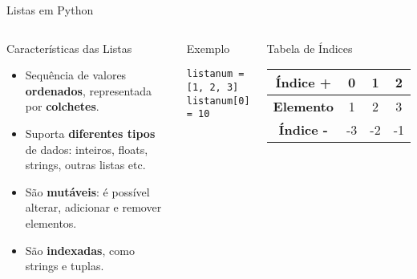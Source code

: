 \begin{frame}[fragile]{Listas em Python}

\begin{columns}[T]
    \begin{block}{Características das Listas}
        \begin{itemize}
            \item Sequência de valores \textbf{ordenados}, representada por \textbf{colchetes}.
            \item Suporta \textbf{diferentes tipos} de dados: inteiros, floats, strings, outras listas etc.
            \item São \textbf{mutáveis}: é possível alterar, adicionar e remover elementos.
            \item São \textbf{indexadas}, como strings e tuplas.
        \end{itemize}
    \end{block}

    \begin{block}{Exemplo}
\begin{verbatim}
listanum = [1, 2, 3]
listanum[0] = 10
\end{verbatim}
    \end{block}

    \begin{exampleblock}{Tabela de Índices}
    \centering
    \begin{tabular}{|c|c|c|c|}
        \hline
        \textbf{Índice +} & 0 & 1 & 2 \\
        \hline
        \textbf{Elemento} & 1 & 2 & 3 \\
        \hline
        \textbf{Índice -} & -3 & -2 & -1 \\
        \hline
    \end{tabular}
    \end{exampleblock}
\end{columns}

\end{frame}

